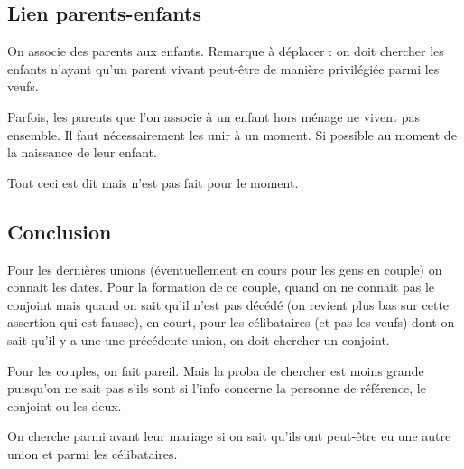 \subsection{Lien parents-enfants}
On associe des parents aux enfants.
Remarque à déplacer : on doit chercher les enfants n'ayant qu'un parent vivant peut-être de manière privilégiée parmi les veufs. 

Parfois, les parents que l'on associe à un enfant hors ménage ne vivent pas ensemble.
Il faut nécessairement les unir à un moment. Si possible au moment de la naissance de leur enfant. 

Tout ceci est dit mais n'est pas fait pour le moment. 

\subsection{Conclusion}
Pour les dernières unions (éventuellement en cours pour les gens en couple) on connait les dates. 
Pour la formation de ce couple, quand on ne connait pas le conjoint mais quand on sait qu'il n'est pas décédé (on revient plus bas sur cette assertion qui est fausse), en court, pour les célibataires (et pas les veufs) dont on sait qu'il y a une une précédente union, on doit chercher un conjoint. 

Pour les couples, on fait pareil. 
Mais la proba de chercher est moins grande puisqu'on ne sait pas s'ils sont si l'info concerne la personne de référence, le conjoint ou les deux. 

On cherche parmi avant leur mariage si on sait qu'ils ont peut-être eu une autre union et parmi les célibataires. 









